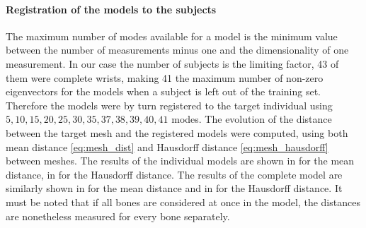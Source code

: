 \paragraph{Registration of the models to the subjects}

The maximum number of modes available for a model is the minimum value between the number of measurements minus one and the dimensionality of one measurement. In our case the number of subjects is the limiting factor, 43 of them were complete wrists, making 41 the maximum number of non-zero eigenvectors for the models when a subject is left out of the training set. Therefore the models were by turn registered to the target individual using $5, 10, 15, 20, 25, 30, 35, 37, 38, 39, 40, 41$ modes. The evolution of the distance between the target mesh and the registered models were computed, using both mean distance \eqref{eq:mesh_dist} and Hausdorff distance \eqref{eq:mesh_hausdorff} between meshes. The results of the individual models are shown in  for the mean distance, in  for the Hausdorff distance. 
The results of the complete model are similarly shown in  for the mean distance and in  for the Hausdorff distance. It must be noted that if all bones are considered at once in the model, the distances are nonetheless measured for every bone separately. 


	
